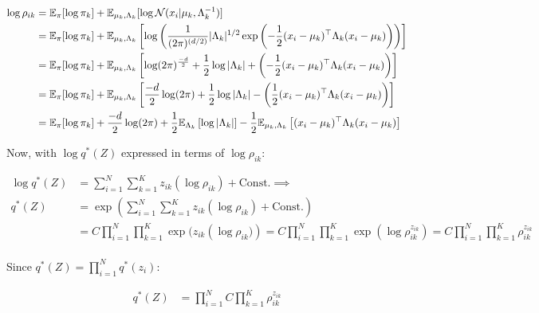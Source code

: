 \documentclass{article}
\def\C{\text{Const.}}
\begin{document}
\begin{equation}
\begin{split}
    \log \rho_{ik} &= \mathbb{E}_{\pi}  [ \log \pi_k ]  + \mathbb{E}_{\mu_k, \Lambda_k} [ \log \mathcal{N}(x_i | \mu_{k}, \Lambda_{k}^{-1})] \\
    &= \mathbb{E}_{\pi}  [ \log \pi_k ]  + \mathbb{E}_{\mu_k, \Lambda_k} \left[ \log \left( \frac{1}{(2\pi)^{(d/2)} } | \Lambda_k |^{1/2} \exp \left( -\frac{1}{2} (x_i - \mu_{k})^\top \Lambda_k (x_i - \mu_{k}) \right) \right) \right] \\
    &= \mathbb{E}_{\pi}  [ \log \pi_k ]  + \mathbb{E}_{\mu_k, \Lambda_k} \left[ \log (2\pi)^{\frac{-d}{2}} + \frac{1}{2} \log |\Lambda_k| + \left( -\frac{1}{2} (x_i - \mu_{k})^\top \Lambda_k (x_i - \mu_{k}) \right) \right] \\
    &= \mathbb{E}_{\pi}  [ \log \pi_k ]  + \mathbb{E}_{\mu_k, \Lambda_k} \left[ \frac{-d}{2} \log (2\pi) + \frac{1}{2} \log |\Lambda_k| - \left( \frac{1}{2} (x_i - \mu_{k})^\top \Lambda_k (x_i - \mu_{k}) \right) \right] \\
    &= \mathbb{E}_{\pi}  [ \log \pi_k ]  + \frac{-d}{2} \log (2\pi) + \frac{1}{2} \mathbb{E}_{\Lambda_k} \left[  \log |\Lambda_k| \right] - \frac{1}{2} \mathbb{E}_{\mu_k, \Lambda_k} \left[   (x_i - \mu_{k})^\top \Lambda_k (x_i - \mu_{k})  \right] \\
\end{split}
\end{equation}

Now, with $\log q^*(Z)$ expressed in terms of $\log \rho_{ik}$:

\begin{equation}
\begin{split}
    \log q^*(Z) &= \sum^N_{i=1} \sum^K_{k=1} z_{ik} \left( \log \rho_{ik} \right) + \C \implies\\
   q^*(Z) &= \exp \left( \sum^N_{i=1} \sum^K_{k=1} z_{ik} \left( \log \rho_{ik} \right) + \C \right)\\
    &=  C \prod^N_{i=1} \prod^K_{k=1} \exp ( z_{ik} \left( \log \rho_{ik} )  \right)
    =  C \prod^N_{i=1} \prod^K_{k=1} \exp \left( \log \rho_{ik}^{z_{ik}} \right) 
   =  C \prod^N_{i=1} \prod^K_{k=1} \rho_{ik}^{z_{ik}} \\
\end{split}
\end{equation}

Since  $q^*(Z) = \prod^N_{i=1}q^*(z_i)$:

\begin{equation}
\begin{split}
  q^*(Z) &=  \prod^N_{i=1} C \prod^K_{k=1} \rho_{ik}^{z_{ik}} \\
\end{split}
\end{equation}
\end{document}
